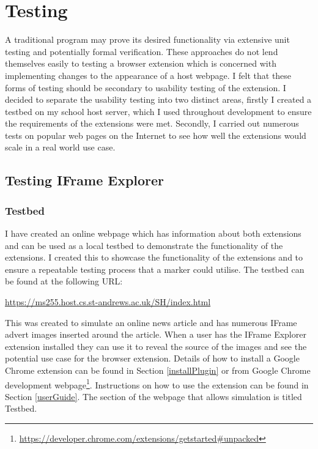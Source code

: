 \documentclass[12pt]{article}
\begin{document}
\pagebreak

\section{Testing} \label{testing}
A traditional program may prove its desired functionality via extensive unit testing and potentially formal verification. These approaches do not lend themselves easily to testing a browser extension which is concerned with implementing changes to the appearance of a host webpage. I felt that these forms of testing should be secondary to usability testing of the extension. I decided to separate the usability testing into two distinct areas, firstly I created a testbed on my school host server, which I used throughout development to ensure the requirements of the extensions were met. Secondly, I carried out numerous tests on popular web pages on the Internet to see how well the extensions would scale in a real world use case. 

\subsection{Testing IFrame Explorer}

\subsubsection{Testbed}
I have created an online webpage which has information about both extensions and can be used as a local testbed to demonstrate the functionality of the extensions. I created this to showcase the functionality of the extensions and to ensure a repeatable testing process that a marker could utilise. The testbed can be found at the following URL: 

\begin{center}
\url{https://ms255.host.cs.st-andrews.ac.uk/SH/index.html}
\end{center}

This was created to simulate an online news article and has numerous IFrame advert images inserted around the article. When a user has the IFrame Explorer extension installed they can use it to reveal the source of the images and see the potential use case for the browser extension. Details of how to install a Google Chrome extension can be found in Section \ref{installPlugin} or from Google Chrome development webpage\footnote{\url{ https://developer.chrome.com/extensions/getstarted\#unpacked}}. Instructions on how to use the extension can be found in Section \ref{userGuide}. The section of the webpage that allows simulation is titled Testbed. 
\end{document}
